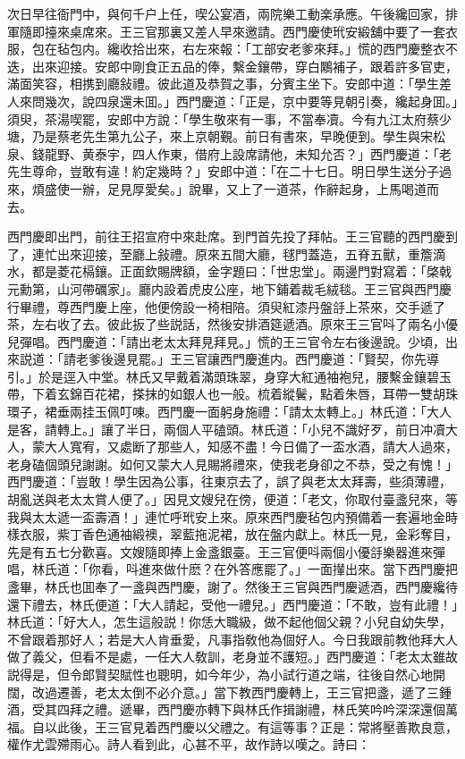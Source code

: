 次日早往衙門中，與何千户上任，喫公宴酒，兩院樂工動楽承應。午後纔回家，排軍隨即擡來桌席來。王三官那裏又差人早來邀請。西門慶使玳安緞舖中要了一套衣服，包在毡包内。纔收拾出來，右左來報：「工部安老爹來拜。」慌的西門慶整衣不迭，出來迎接。安郎中剛食正五品的俸，繫金鑲帶，穿白鷴補子，跟着許多官吏，滿面笑容，相携到廳敍禮。彼此道及恭賀之事，分賓主坐下。安郎中道：「學生差人來問幾次，說四泉還未囬。」西門慶道：「正是，京中要等見朝引奏，纔起身囬。」須臾，茶湯喫罷，安郎中方說：「學生敬來有一事，不當奉凟。今有九江太府蔡少塘，乃是蔡老先生第九公子，來上京朝覲。前日有書來，早晚便到。學生與宋松泉、錢龍野、黄泰宇，四人作東，借府上設席請他，未知允否？」西門慶道：「老先生尊命，豈敢有違！約定幾時？」安郎中道：「在二十七日。明日學生送分子過來，煩盛使一辦，足見厚愛矣。」說畢，又上了一道茶，作辭起身，上馬喝道而去。

西門慶即出門，前往王招宣府中來赴席。到門首先投了拜帖。王三官聽的西門慶到了，連忙出來迎接，至廳上敍禮。原來五間大廳，毬門蓋造，五脊五獸，重簷滴水，都是菱花槅鑲。正面欽賜牌額，金字題曰：「世忠堂」。兩邊門對寫着：「棨戟元勳第，山河帶礪家」。廳内設着虎皮公座，地下鋪着裁毛絨毯。王三官與西門慶行畢禮，尊西門慶上座，他便傍設一椅相陪。須臾紅漆丹盤㧱上茶來，交手遞了茶，左右收了去。彼此扳了些説話，然後安排酒筵遞酒。原來王三官呌了兩名小優兒彈唱。西門慶道：「請出老太太拜見拜見。」慌的王三官令左右後邊說。少頃，出來説道：「請老爹後邊見罷。」王三官讓西門慶進内。西門慶道：「賢契，你先導引。」於是逕入中堂。林氏又早戴着滿頭珠翠，身穿大紅通袖袍兒，腰繫金鑲碧玉帶，下着玄錦百花裙，搽抹的如銀人也一般。梳着縱鬢，點着朱唇，耳帶一雙胡珠環子，裙垂兩挂玉佩叮㖦。西門慶一面躬身施禮：「請太太轉上。」林氏道：「大人是客，請轉上。」讓了半日，兩個人平磕頭。林氏道：「小兒不識好歹，前日冲凟大人，蒙大人寬宥，又處断了那些人，知感不盡！今日備了一盃水酒，請大人過來，老身磕個頭兒謝謝。如何又蒙大人見賜將禮來，使我老身卻之不恭，受之有愧！」西門慶道：「豈敢！學生因為公事，往東京去了，誤了與老太太拜壽，些須薄禮，胡亂送與老太太賞人便了。」因見文嫂兒在傍，便道：「老文，你取付臺盞兒來，等我與太太遞一盃壽酒！」連忙呼玳安上來。原來西門慶毡包内預備着一套遍地金時樣衣服，紫丁香色通袖緞襖，翠藍拖泥裙，放在盤内獻上。林氏一見，金彩奪目，先是有五七分歡喜。文嫂隨即捧上金盞銀臺。王三官便呌兩個小優㧱樂器進來彈唱，林氏道：「你看，呌進來做什麽？在外答應罷了。」一面攆出來。當下西門慶把盞畢，林氏也囬奉了一盞與西門慶，謝了。然後王三官與西門慶遞酒，西門慶纔待還下禮去，林氏便道：「大人請起，受他一禮兒。」西門慶道：「不敢，豈有此禮！」林氏道：「好大人，怎生這般説！你恁大職級，做不起他個父親？小兒自幼失學，不曾跟着那好人；若是大人肯垂愛，凡事指敎他為個好人。今日我跟前教他拜大人做了義父，但看不是處，一任大人敎訓，老身並不護短。」西門慶道：「老太太雖故説得是，但令郎賢契賦性也聰明，如今年少，為小試行道之端，往後自然心地開闊，改過遷善，老太太倒不必介意。」當下教西門慶轉上，王三官把盞，遞了三鍾酒，受其四拜之禮。遞畢，西門慶亦轉下與林氏作揖謝禮，林氏笑吟吟深深還個萬福。自以此後，王三官見着西門慶以父禮之。有這等事？正是：常將壓善欺良意，權作尤雲殢雨心。詩人看到此，心甚不平，故作詩以嘆之。詩曰：

